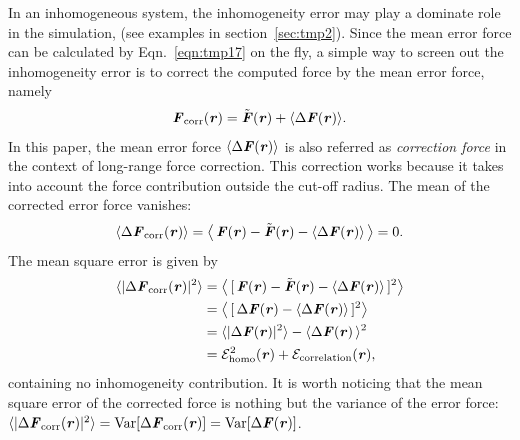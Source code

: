 \documentclass[aps, pre, preprint]{revtex4}
\renewcommand{\v}[1]{\textbf{\textit{#1}}}
\begin{document}
In an inhomogeneous system, the inhomogeneity error may play a
dominate role in the simulation, (see examples in section~\ref{sec:tmp2}).
Since the mean error force can be calculated
by Eqn.~\eqref{eqn:tmp17} on the fly, a simple way to screen out the
inhomogeneity error is to correct the computed force by the mean error
force, namely
\begin{align}\label{eqn:define-fcorr}
  \v F_{\textrm{corr}}(\v r) = \tilde{\v F}(\v r) + \langle\Delta\v F(\v r)\rangle.
\end{align}
In this paper, the mean error force $\langle\Delta\v F(\v r)\rangle$
is also referred as \emph{correction force} in the context of
long-range force correction. This correction works because it takes
into account the force contribution outside the cut-off radius. The mean of
the corrected error force vanishes:
\begin{align}\label{eqn:mean-fcorr}
  \langle\Delta\v F_{\textrm{corr}}(\v r)\rangle
   =
  \big\langle\,
  \v F(\v r) - \tilde{\v F}(\v r) - \langle\Delta\v F(\v r)\rangle\,
  \big\rangle = 0.
\end{align}
The mean square error is given by
\begin{align} \nonumber
  \langle\vert\Delta\v F_{\textrm{corr}}(\v r)\vert^2\rangle
  & =
  \big\langle\,
  [\,\v F(\v r) - \tilde{\v F}(\v r) - \langle\Delta\v F(\v r)\rangle\,]^2
  \big\rangle \\\nonumber
  & =
  \big\langle\,
  [\,\Delta\v F(\v r) - \langle\Delta\v F(\v r)\rangle\,]^2
  \big\rangle \\\nonumber
  & =
  \langle\vert\Delta\v F(\v r)\vert^2\rangle -
  \langle\Delta\v F(\v r)\,\rangle^2 \\
  & =
  \mathcal E^2_{\textrm{homo}}(\v r) +
  \mathcal E_{\textrm{correlation}}(\v r),
\end{align}
containing no inhomogeneity contribution.  It is worth noticing that the mean
square error of the corrected force is nothing but the variance of the
error force: $\langle\vert\Delta\v
F_{\textrm{corr}}(\v r)\vert^2\rangle = \textrm{Var}[\Delta\v
F_{\textrm{corr}}(\v r)] = \textrm{Var}[\Delta\v F(\v r)]$.
\end{document}
